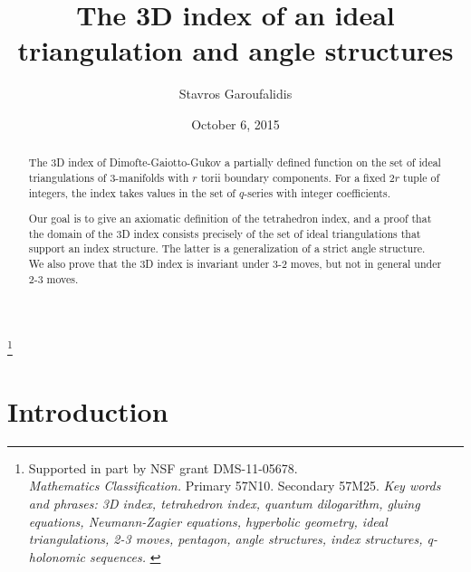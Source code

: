 \documentclass[12pt]{amsart}
\theoremstyle{definition}
\numberwithin{equation}{section}
\begin{document}
\title[The 3D index of an ideal triangulation and angle structures]{
The 3D index of an ideal triangulation and angle structures}

\author{Stavros Garoufalidis}
\address{School of Mathematics \\
         Georgia Institute of Technology \\
         Atlanta, GA 30332-0160, USA \newline
         {\tt \url{http://www.math.gatech.edu/~stavros }}}
\thanks{Supported in part by NSF grant DMS-11-05678. 
\\
 {\em Mathematics Classification.} Primary 57N10. Secondary 57M25.
\newline
{\em Key words and phrases: 3D index, tetrahedron index, quantum dilogarithm,
gluing equations, Neumann-Zagier equations, hyperbolic geometry, 
ideal triangulations, 2-3 moves, pentagon, angle structures, index structures, 
q-holonomic sequences.
}
}

\date{October 6, 2015}%


\begin{abstract}
The 3D index of Dimofte-Gaiotto-Gukov a partially defined function
on the set of ideal triangulations of 3-manifolds with $r$ torii 
boundary components. For a fixed $2r$ tuple of integers, 
the index takes values in the set of $q$-series with integer coefficients.

Our goal is to give an axiomatic definition of the tetrahedron index,
and a proof that the domain of the 3D index consists precisely of the set of 
ideal triangulations that support an index structure. The latter is
a generalization of a strict angle structure. We also prove that the 3D index 
is invariant under 3-2 moves, but not in general under 2-3 moves.
\end{abstract}

\maketitle

\tableofcontents

\section{Introduction}
\label{sec.intro}

\end{document}
